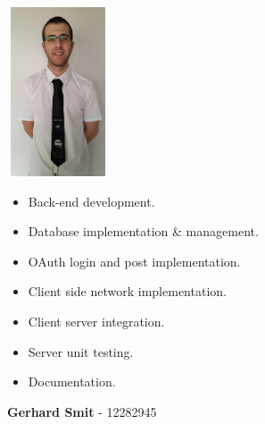 \documentclass[letterpaper]{article}
\begin{document}
		\begin{minipage}[l]{0.23\textwidth}
			\begin{flushleft}
				\includegraphics[width=30mm,height=50mm]{Members/Martin.jpg}
			\end{flushleft}
		\end{minipage}
		\begin{minipage}[r]{0.75\textwidth}
			\begin{itemize}
				\item Back-end development.
				\item Database implementation \& management.
				\item OAuth login and post implementation.
				\item Client side network implementation.
				\item Client server integration.
				\item Server unit testing.
				\item Documentation.
			\end{itemize}
		\end{minipage}
		
		\newpage
		\begin{flushleft}
			\begin{Large}
				\textbf{Gerhard Smit} - 12282945 \\
			\end{Large}
		\end{flushleft}
				
\end{document}
